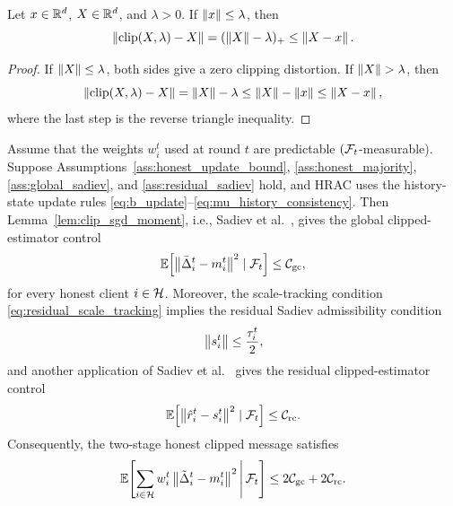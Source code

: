 \begin{lemma}
\label{lem:protected_center_distortion}
Let \(x\in\mathbb{R}^d\), \(X\in\mathbb{R}^d\), and \(\lambda>0\). If \(\left\lVert x \right\rVert\le\lambda\),
then
\begin{equation}
    \left\lVert \operatorname{clip}(X,\lambda)-X \right\rVert
    =
    (\left\lVert X \right\rVert-\lambda)_+
    \le
    \left\lVert X-x \right\rVert.
    \label{eq:protected_center_distortion}
\end{equation}
\end{lemma}

\begin{proof}
If \(\left\lVert X \right\rVert\le\lambda\), both sides give a zero clipping distortion. If
\(\left\lVert X \right\rVert>\lambda\), then
\[
    \left\lVert \operatorname{clip}(X,\lambda)-X \right\rVert
    =
    \left\lVert X \right\rVert-\lambda
    \le
    \left\lVert X \right\rVert-\left\lVert x \right\rVert
    \le
    \left\lVert X-x \right\rVert,
\]
where the last step is the reverse triangle inequality.
\end{proof}

\begin{proposition}
\label{prop:clip_sgd_budget_certificate}
Assume that the weights \(w_i^t\) used at round \(t\) are predictable
\((\mathcal{F}_t\)-measurable). Suppose Assumptions~\ref{ass:honest_update_bound},
\ref{ass:honest_majority}, \ref{ass:global_sadiev},
and \ref{ass:residual_sadiev} hold, and HRAC uses the history-state update rules
\eqref{eq:b_update}--\eqref{eq:mu_history_consistency}. Then
Lemma~\ref{lem:clip_sgd_moment}, i.e.,
Sadiev et al.~\cite[Lemma~5.1]{sadiev2023highprob}, gives the global
clipped-estimator control
\begin{equation}
    \mathbb{E}\!\left[\left\lVert \bar\Delta_i^t-m_i^t \right\rVert^2\mid\mathcal{F}_t\right]
    \le
    \mathcal C_{\mathrm{gc}},
    \label{eq:clip_sgd_gc_control}
\end{equation}
for every honest client \(i\in\mathcal{H}\). Moreover, the scale-tracking condition
\eqref{eq:residual_scale_tracking} implies the residual Sadiev admissibility
condition
\begin{equation}
    \left\lVert s_i^t \right\rVert\le \frac{\tau_i^t}{2},
    \label{eq:residual_sadiev_admissibility}
\end{equation}
and another application of Sadiev et al.~\cite[Lemma~5.1]{sadiev2023highprob}
gives the residual clipped-estimator control
\begin{equation}
    \mathbb{E}\!\left[\left\lVert \hat r_i^t-s_i^t \right\rVert^2\mid\mathcal{F}_t\right]
    \le \mathcal C_{\mathrm{rc}}.
    \label{eq:clip_sgd_rc_control}
\end{equation}
Consequently, the two-stage honest clipped message satisfies
\begin{equation}
    \mathbb{E}\!\left[
        \sum_{i\in\mathcal{H}}w_i^t\left\lVert \tilde\Delta_i^t-m_i^t \right\rVert^2
        \,\middle|\,\mathcal{F}_t
    \right]
    \le
    2\mathcal C_{\mathrm{gc}}+2\mathcal C_{\mathrm{rc}}.
    \label{eq:two_stage_honest_control}
\end{equation}
\end{proposition}

